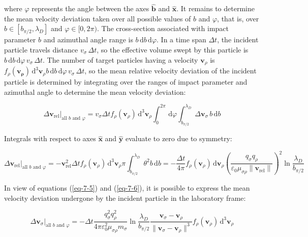 where $\varphi$ represents the angle between the axes $\mathbf{\hat{b}}$ and $\mathbf{\hat{x}}$. It remains to determine the mean velocity deviation taken over all possible values of $b$ and $\varphi$, that is, over $b\in[b_{\pi/2},\lambda_D]$ and $\varphi\in[0,2\pi)$. The cross-section associated with impact parameter $b$ and azimuthal angle range is $b\,\mathrm{d}b\,\mathrm{d}\varphi$. In a time span $\Delta t$, the incident particle travels distance $v_\sigma\,\Delta t$, so the effective volume swept by this particle is $b\,\mathrm{d}b\,\mathrm{d}\varphi\,v_\sigma\,\Delta t$. The number of target particles having a velocity $\mathbf{v}_\rho$ is $f_\rho(\mathbf{\mathbf{v}_\rho})\,\mathrm{d}^3\mathbf{v}_\rho b\,\mathrm{d}b\,\mathrm{d}\varphi\,v_\sigma\,\Delta t$, so the mean relative velocity deviation of the incident particle is determined by integrating over the ranges of impact parameter and azimuthal angle to determine the mean velocity deviation:

\begin{equation}
    \Delta\mathbf{v}_\text{rel}\Bigr|_{\text{all }b\text{ and }\varphi}=v_\sigma\Delta tf_\rho (\mathbf{v}_\rho )\,\mathrm{d}^3\mathbf{v}_\rho \int_0^{2\pi}\,\mathrm{d}\varphi\int_{b_{\pi/2}}^{\lambda_D}\Delta\mathbf{v}_\sigma\,b\,\mathrm{d}b
\end{equation}

Integrals with respect to axes $\mathbf{\hat{x}}$ and $\mathbf{\hat{y}}$ evaluate to zero due to symmetry:

\begin{equation}
    \Delta\mathbf{v}_\text{rel}\Bigr|_{\text{all }b\text{ and }\varphi}=-\mathbf{v}_\text{rel}^2\Delta tf_\rho (\mathbf{v}_\rho )\,\mathrm{d}^3\mathbf{v}_\rho \pi\int_{b_{\pi/2}}^{\lambda_D}\theta^2b\,\mathrm{d}b=-\frac{\Delta t}{4\pi}f_\rho (\mathbf{v}_\rho )\,\mathrm{d}\mathbf{v}_\rho\left(\frac{q_\sigma q_\rho }{\varepsilon_0\mu_{\sigma\rho}\|\mathbf{v}_\text{rel}\|}\right)^2\ln{\frac{\lambda_D}{b_{\pi/2}}}
\end{equation}

In view of equations (\ref{eq-7-5}) and (\ref{eq-7-6}), it is possible to express the mean velocity deviation undergone by the incident particle in the laboratory frame:

\begin{equation}
     \Delta\mathbf{v}_\sigma\Bigr|_{\text{all }b\text{ and }\varphi}=-\Delta t\frac{q_\sigma ^2q_\rho ^2}{4\pi\varepsilon_0^2\mu_{\sigma\rho} m_\sigma }\ln{\frac{\lambda_D}{b_{\pi/2}}}\frac{\mathbf{v}_\sigma -\mathbf{v}_\rho }{\|\mathbf{v}_\sigma -\mathbf{v}_\rho \|^3}f_\rho (\mathbf{v}_\rho )\,\mathrm{d}^3\mathbf{v}_\rho 
\end{equation}

